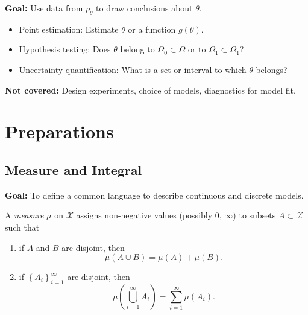 \documentclass[a4paper]{article}
\begin{document}
\noindent \textbf{Goal:} Use data from $p_{\theta}$ to draw conclusions about $\theta$.
\begin{itemize}
	\item Point estimation: Estimate $\theta$ or a function $g(\theta)$.
	\item Hypothesis testing: Does $\theta$ belong to $\Omega_0 \subset \Omega$ or to $\Omega_1 \subset \Omega_1$?
	\item Uncertainty quantification: What is a set or interval to which $\theta$ belongs?
\end{itemize}

\begin{center}
\end{center}

\noindent \textbf{Not covered:} Design experiments, choice of models, diagnostics for model fit.

\section{Preparations}

\subsection{Measure and Integral}
\textbf{Goal:} To define a common language to describe continuous and discrete models.

\begin{defi}[Measure]
	A \emph{measure} $\mu$ on $\mathcal{X}$ assigns non-negative values (possibly 0, $\infty$) to subsets $A \subset \mathcal{X}$ such that
	\begin{enumerate}
		\item if $A$ and $B$ are disjoint, then 
		\begin{equation}
			\mu(A \cup B) = \mu (A) + \mu(B).
		\end{equation}
		\item if $\left\{A_i\right\}_{i = 1}^{\infty}$ are disjoint, then
		\begin{equation}
			\mu\left(\bigcup\limits_{i = 1}^{\infty}A_i\right) = \sum\limits_{i = 1}^{\infty}\mu(A_i).
		\end{equation} 
	\end{enumerate}
\end{defi}
\end{document}
